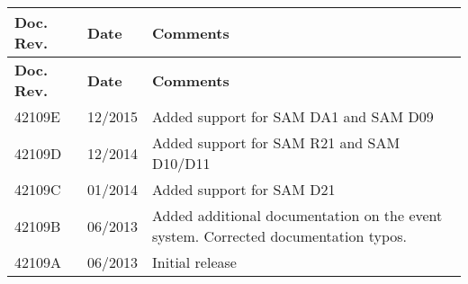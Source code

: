 \tabulinesep=1mm
\begin{longtabu}spread 0pt [c]{*{3}{|X[-1]}|}
\hline
\cellcolor{\tableheadbgcolor}\textbf{ Doc. Rev. }&\cellcolor{\tableheadbgcolor}\textbf{ Date }&\cellcolor{\tableheadbgcolor}\textbf{ Comments   }\\
\endfirsthead
\hline
\endfoot
\hline
\cellcolor{\tableheadbgcolor}\textbf{ Doc. Rev. }&\cellcolor{\tableheadbgcolor}\textbf{ Date }&\cellcolor{\tableheadbgcolor}\textbf{ Comments   }\\
\endhead
42109E &12/2015 &Added support for SAM DA1 and SAM D09  \\
42109D &12/2014 &Added support for SAM R21 and SAM D10/\+D11  \\
42109C &01/2014 &Added support for SAM D21  \\
42109B &06/2013 &Added additional documentation on the event system. Corrected documentation typos.  \\
42109A &06/2013 &Initial release   \\
\end{longtabu}
